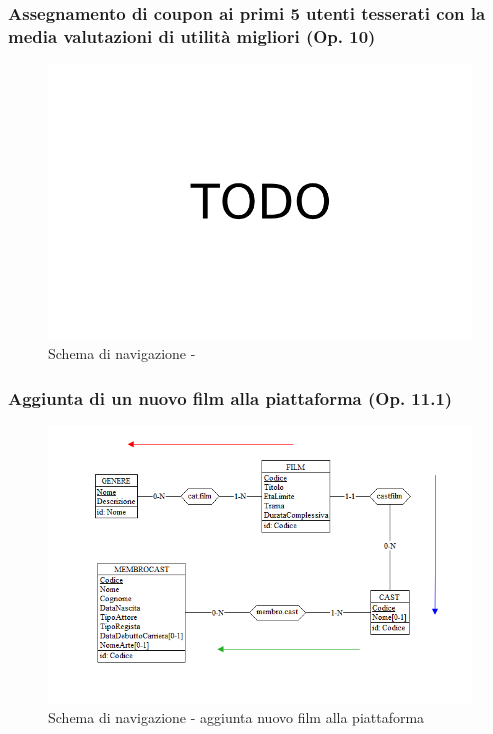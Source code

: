 \documentclass[a4paper,12pt]{report}
\begin{document}
	\subsubsection{Assegnamento di coupon ai primi 5 utenti tesserati con la media valutazioni di utilità migliori (Op. 10)}
	\begin{figure}[H]
		\centering
		\includegraphics[width=450pt]{ER/navigazione/couponutentimigliori.png}
		\caption{Schema di navigazione - }
	\end{figure}
	
	\subsubsection{Aggiunta di un nuovo film alla piattaforma (Op. 11.1)}
	\begin{figure}[H]
		\centering
		\includegraphics[width=450pt]{ER/navigazione/aggiuntafilm.png}
		\caption{Schema di navigazione - aggiunta nuovo film alla piattaforma}
	\end{figure}
	
\end{document}
